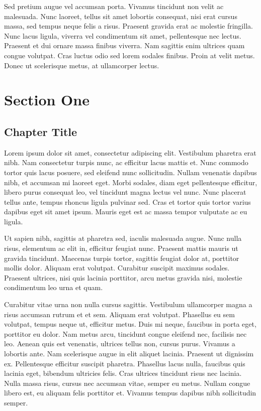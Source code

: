 \documentclass[a4paper]{memoir}
\begin{document}
Sed pretium augue vel accumsan porta. Vivamus tincidunt non velit ac malesuada. Nunc laoreet, tellus sit amet lobortis consequat, nisi erat cursus massa, sed tempus neque felis a risus. Praesent gravida erat ac molestie fringilla. Nunc lacus ligula, viverra vel condimentum sit amet, pellentesque nec lectus. Praesent et dui ornare massa finibus viverra. Nam sagittis enim ultrices quam congue volutpat. Cras luctus odio sed lorem sodales finibus. Proin at velit metus. Donec ut scelerisque metus, at ullamcorper lectus. 

\part{Section One}
\label{sectionone}

\chapter{Chapter Title}
\label{chaptertitle}

Lorem ipsum dolor sit amet, consectetur adipiscing elit. Vestibulum pharetra erat nibh. Nam consectetur turpis nunc, ac efficitur lacus mattis et. Nunc commodo tortor quis lacus posuere, sed eleifend nunc sollicitudin. Nullam venenatis dapibus nibh, et accumsan mi laoreet eget. Morbi sodales, diam eget pellentesque efficitur, libero purus consequat leo, vel tincidunt magna lectus vel nunc. Nunc placerat tellus ante, tempus rhoncus ligula pulvinar sed. Cras et tortor quis tortor varius dapibus eget sit amet ipsum. Mauris eget est ac massa tempor vulputate ac eu ligula. 

Ut sapien nibh, sagittis at pharetra sed, iaculis malesuada augue. Nunc nulla risus, elementum ac elit in, efficitur feugiat nunc. Praesent mattis mauris ut gravida tincidunt. Maecenas turpis tortor, sagittis feugiat dolor at, porttitor mollis dolor. Aliquam erat volutpat. Curabitur suscipit maximus sodales. Praesent ultrices, nisi quis lacinia porttitor, arcu metus gravida nisi, molestie condimentum leo urna et quam. 

Curabitur vitae urna non nulla cursus sagittis. Vestibulum ullamcorper magna a risus accumsan rutrum et et sem. Aliquam erat volutpat. Phasellus eu sem volutpat, tempus neque ut, efficitur metus. Duis mi neque, faucibus in porta eget, porttitor eu dolor. Nam metus arcu, tincidunt congue eleifend nec, facilisis nec leo. Aenean quis est venenatis, ultrices tellus non, cursus purus. Vivamus a lobortis ante. Nam scelerisque augue in elit aliquet lacinia. Praesent ut dignissim ex. Pellentesque efficitur suscipit pharetra. Phasellus lacus nulla, faucibus quis lacinia eget, bibendum ultricies felis. Cras ultrices tincidunt risus nec lacinia. Nulla massa risus, cursus nec accumsan vitae, semper eu metus. Nullam congue libero est, eu aliquam felis porttitor et. Vivamus tempus dapibus nibh sollicitudin semper. 
\end{document}
